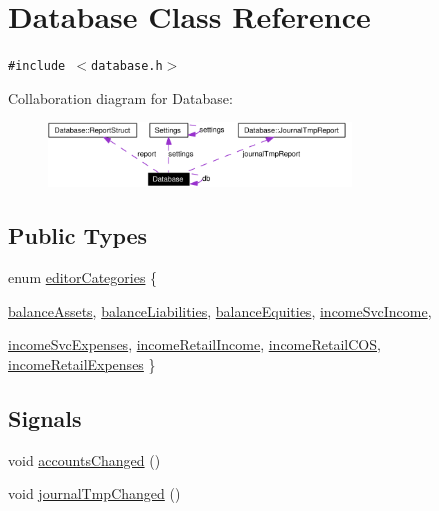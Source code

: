 \hypertarget{classDatabase}{
\section{Database Class Reference}
\label{classDatabase}
}
{\tt \#include $<$database.h$>$}

Collaboration diagram for Database:\begin{figure}[H]
\begin{center}
\leavevmode
\includegraphics[width=228pt]{classDatabase__coll__graph}
\end{center}
\end{figure}
\subsection*{Public Types}
\begin{CompactItemize}
\item 
enum \hyperlink{classDatabase_w8}{editor\-Categories} \{ \par
\hyperlink{classDatabase_w8w0}{balance\-Assets}, 
\hyperlink{classDatabase_w8w1}{balance\-Liabilities}, 
\hyperlink{classDatabase_w8w2}{balance\-Equities}, 
\hyperlink{classDatabase_w8w3}{income\-Svc\-Income}, 
\par
\hyperlink{classDatabase_w8w4}{income\-Svc\-Expenses}, 
\hyperlink{classDatabase_w8w5}{income\-Retail\-Income}, 
\hyperlink{classDatabase_w8w6}{income\-Retail\-COS}, 
\hyperlink{classDatabase_w8w7}{income\-Retail\-Expenses}
 \}
\end{CompactItemize}
\subsection*{Signals}
\begin{CompactItemize}
\item 
void \hyperlink{classDatabase_l0}{accounts\-Changed} ()
\item 
void \hyperlink{classDatabase_l1}{journal\-Tmp\-Changed} ()
\end{CompactItemize}
